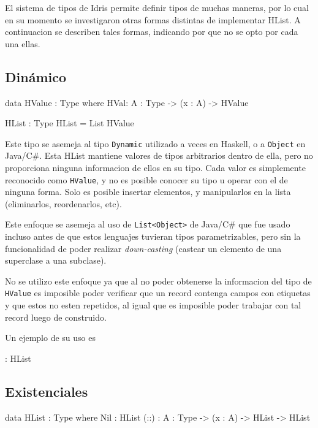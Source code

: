 El sistema de tipos de Idris permite definir tipos de muchas maneras, por lo cual en su momento se investigaron otras formas distintas de implementar HList.
A continuacion se describen tales formas, indicando por que no se opto por cada una ellas.

\subsection{Dinámico}

\begin{code}
data HValue : Type where
    HVal: {A : Type} -> (x : A) -> HValue

HList : Type
HList = List HValue 
\end{code}

Este tipo se asemeja al tipo \texttt{Dynamic} utilizado a veces en Haskell, o a \texttt{Object} en Java/C\#. Esta HList mantiene valores de tipos arbitrarios dentro de ella, pero no proporciona ninguna informacion de ellos en su tipo. Cada valor es simplemente reconocido como \texttt{HValue}, y no es posible conocer su tipo u operar con el de ninguna forma. Solo es posible insertar elementos, y manipularlos en la lista (eliminarlos, reordenarlos, etc).

Este enfoque se asemeja al uso de \texttt{List<Object>} de Java/C\# que fue usado incluso antes de que estos lenguajes tuvieran tipos parametrizables, pero sin la funcionalidad de poder realizar \textit{down-casting} (castear un elemento de una superclase a una subclase).

No se utilizo este enfoque ya que al no poder obtenerse la informacion del tipo de \texttt{HValue} es imposible poder verificar que un record contenga campos con etiquetas y que estos no esten repetidos, al igual que es imposible poder trabajar con tal record luego de construido.

Un ejemplo de su uso es 

\begin{code}
 : HList
\end{code}

\subsection{Existenciales}

\begin{code}
data HList : Type where
    Nil : HList
    (::) : {A : Type} -> (x : A) -> HList -> HList
\end{code}

